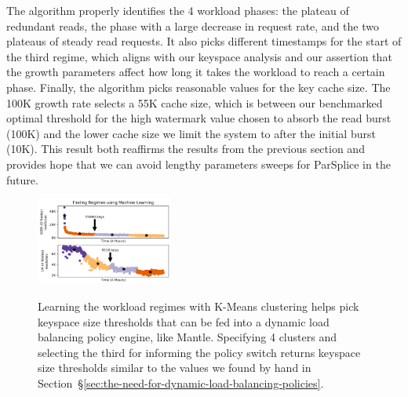The algorithm properly identifies the 4 workload phases: the plateau of
redundant reads, the phase with a large decrease in request rate, and the two
plateaus of steady read requests. It also picks different timestamps for the
start of the third regime, which aligns with our keyspace analysis and our
assertion that the growth parameters affect how long it takes the workload to
reach a certain phase.  Finally, the algorithm picks reasonable values for the
key cache size. The 100K growth rate selects a 55K cache size, which is between
our benchmarked optimal threshold for the high watermark value chosen to
absorb the read burst (100K) and the lower cache size we limit the system to
after the initial burst (10K). This result both reaffirms the results from the
previous section and provides hope that we can avoid lengthy parameters sweeps
for ParSplice in the future.

\begin{figure}[t]
\noindent\includegraphics[width=0.4\textwidth]{figures/futurework-regimes.png}\\
  \caption{Learning the workload regimes with K-Means clustering helps pick
  keyspace size thresholds that can be fed into a dynamic load balancing policy
  engine, like Mantle. Specifying 4 clusters and selecting the third for
  informing the policy switch returns keyspace size thresholds similar to the
  values we found by hand in
  Section~\S\ref{sec:the-need-for-dynamic-load-balancing-policies}.
\label{fig:futurework-regimes}}
\end{figure}
